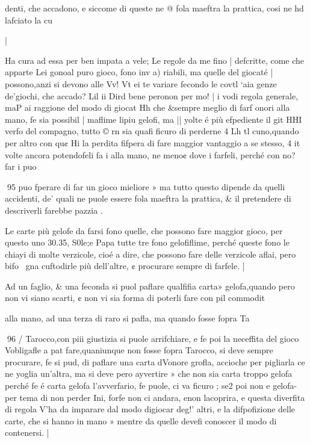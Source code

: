 \documentclass[12pt,a6paper]{article}
\begin{document}
 

denti, che accadono, e siccome
di queste ne @ fola maeftra la
prattica, cosi ne hd lafciato la
cu

 
 

|

Ha cura ad essa per ben impata
a vele; Le regole da me fino
| defcritte, come che apparte
Lei gonoal puro gioco, fono inv
a) riabili, ma quelle del giocaté
| possono,anzi si devono alle Vv!
Vt ei te variare fecondo le covtl
‘aia genze de’giochi, che accado?
Lil ii Dird bene peronon per mo!
| i vodi regola generale, maP
ai raggione del modo di giocat
Hh che &sempre meglio di farf
onori alla mano, fe sia possibil
| maflime lipiu gelofi, ma
|| yolte é più efpediente il git
HHI verfo del compagno, tutto ©
rn  sia quafi ficuro di perderne 4
Lh tl cuno,quando per altro con qu¢
Hi la perdita fifpera di fare maggior
vantaggio a se stesso, 4
it volte ancora potendofeli fa
i alla mano, ne meno¢ dove
i farfeli, perché con no? far
i puo

 

 

 

 

 
95
puo fperare di far un gioco mieliore » ma tutto questo dipende da quelli accidenti, de’ quali
ne puole essere fola maeftra la
prattica, & il pretendere di descriverli farebbe pazzia .

Le carte più gelofe da farsi
fono quelle, che possono fare
maggior gioco, per questo uno
30.35, S0le;e Papa tutte tre fono gelofiflime, perché queste
fono le chiayi di molte verzicole, cioé a dire, che possono fare
delle verzicole aflai, pero bifo~
gna cuftodirle più dell’altre, ¢
procurare sempre di farfele. |

Ad un faglio, & una feconda
si puol paflare qualfifia carta»
gelofa,quando pero non vi siano
scarti, ¢ non vi sia forma di poterli fare con pil commodit

alla mano, ad una terza di raro
si pafla, ma quando fosse fopra
Ta
 

 
96 /
Tarocco,con piii giustizia si puole arrifchiare, e fe poi la neceffita del gioco Vobligafle a pat fare,quaniunque non fosse fopra
Tarocco, si deve sempre procurare, fe si pud, di paflare una
carta dVonore grofla, accioche
per pigliarla ce ne yoglia un’altra, ma si deve pero ayvertire »
che non sia carta troppo gelofa
perché fe é carta gelofa l’avverfario, fe puole, ci va ficuro ; se2
poi non e gelofa-per tema di
non perder Ini, forfe non ci andara, enon lacoprira, e questa
diverfita di regola V’ha da imparare dal modo digiocar deg!’
altri, e la difpofizione delle
carte, che si hanno in mano »
mentre da quelle devefi conoscer il modo di contenersi. |
\end{document}
